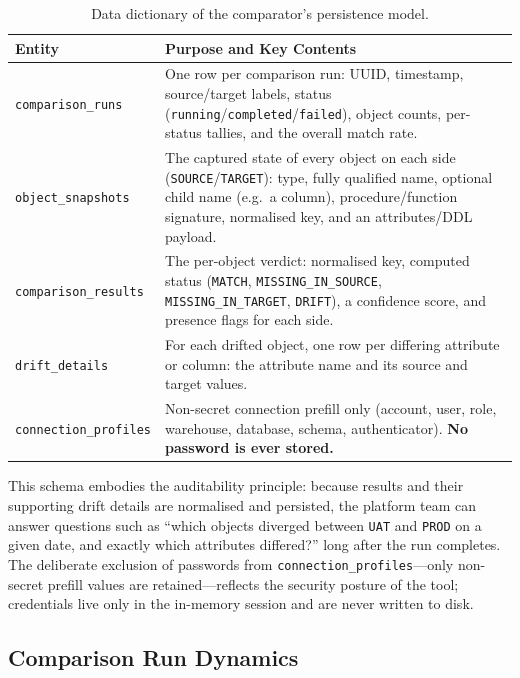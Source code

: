 \begin{table}[H]
  \centering
  \begin{tabularx}{\textwidth}{l X}
    \toprule
    \rowcolor{ibmblue!15}
    \textbf{Entity} & \textbf{Purpose and Key Contents} \\
    \midrule
    \texttt{comparison\_runs}    & One row per comparison run: UUID, timestamp, source/target labels, status (\texttt{running}/\texttt{completed}/\texttt{failed}), object counts, per-status tallies, and the overall match rate. \\
    \texttt{object\_snapshots}   & The captured state of every object on each side (\texttt{SOURCE}/\texttt{TARGET}): type, fully qualified name, optional child name (e.g.\ a column), procedure/function signature, normalised key, and an attributes/DDL payload. \\
    \texttt{comparison\_results} & The per-object verdict: normalised key, computed status (\texttt{MATCH}, \texttt{MISSING\_IN\_SOURCE}, \texttt{MISSING\_IN\_TARGET}, \texttt{DRIFT}), a confidence score, and presence flags for each side. \\
    \texttt{drift\_details}      & For each drifted object, one row per differing attribute or column: the attribute name and its source and target values. \\
    \texttt{connection\_profiles}& Non-secret connection prefill only (account, user, role, warehouse, database, schema, authenticator). \textbf{No password is ever stored.} \\
    \bottomrule
  \end{tabularx}
  \caption{Data dictionary of the comparator's persistence model.}
  \label{tab:data-dictionary}
\end{table}

This schema embodies the auditability principle: because results and their supporting drift details are normalised and persisted, the platform team can answer questions such as ``which objects diverged between \texttt{UAT} and \texttt{PROD} on a given date, and exactly which attributes differed?'' long after the run completes. The deliberate exclusion of passwords from \texttt{connection\_profiles}---only non-secret prefill values are retained---reflects the security posture of the tool; credentials live only in the in-memory session and are never written to disk.

\subsection{Comparison Run Dynamics}
\label{subsec:seq-run}

